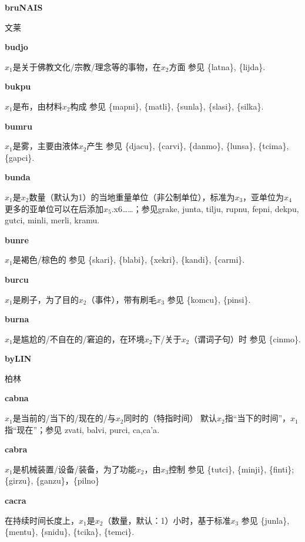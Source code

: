 \documentclass[notitlepage,twocolumn,a4paper,10pt]{book}
\begin{document}
{\sffamily\bfseries bruNAIS} 文莱

{\sffamily\bfseries budjo}\enspace {\ttfamily\bfseries[buj     bu'o]}  $x_1$是关于佛教文化\slash{}宗教\slash{}理念等的事物，在$x_2$方面 \textemdash{} 参见 \{latna\}, \{lijda\}.

{\sffamily\bfseries bukpu}\enspace {\ttfamily\bfseries[buk     bu'u]}  $x_1$是布，由材料$x_2$构成 \textemdash{} 参见 \{mapni\}, \{matli\}, \{sunla\}, \{slasi\}, \{silka\}.

{\sffamily\bfseries bumru}\enspace {\ttfamily\bfseries[bum]}  $x_1$是雾，主要由液体$x_2$产生 \textemdash{} 参见 \{djacu\}, \{carvi\}, \{danmo\}, \{lunsa\}, \{tcima\}, \{gapci\}.

{\sffamily\bfseries bunda}\enspace {\ttfamily\bfseries[bud]}  $x_1$是$x_2$数量（默认为1）的当地重量单位（非公制单位），标准为$x_3$，亚单位为$x_4$ \textemdash{} 更多的亚单位可以在后添加$x_5$.x6……；参见{grake}, {junta}, {tilju}, {rupnu}, {fepni}, {dekpu}, {gutci}, {minli}, {merli}, {kramu}.

{\sffamily\bfseries bunre}\enspace {\ttfamily\bfseries[bur     bu'e]}  $x_1$是褐色\slash{}棕色的 \textemdash{} 参见 \{skari\}, \{blabi\}, \{xekri\}, \{kandi\}, \{carmi\}.

{\sffamily\bfseries burcu}\enspace {\ttfamily\bfseries[    bru]}  $x_1$是刷子，为了目的$x_2$（事件），带有刷毛$x_3$ \textemdash{} 参见 \{komcu\}, \{pinsi\}.

{\sffamily\bfseries burna} $x_1$是尴尬的\slash{}不自在的\slash{}窘迫的，在环境$x_2$下\slash{}关于$x_2$（谓词子句）时 \textemdash{} 参见 \{cinmo\}.

{\sffamily\bfseries byLIN} 柏林

{\sffamily\bfseries cabna}\enspace {\ttfamily\bfseries[cab]}  $x_1$是当前的\slash{}当下的\slash{}现在的\slash{}与$x_2$同时的（特指时间） \textemdash{} 默认$x_2$指“当下的时间”，$x_1$指“现在”；参见 {zvati}, {balvi}, {purci}, {ca},{ca'a}.

{\sffamily\bfseries cabra}\enspace {\ttfamily\bfseries[        ca'a]}  $x_1$是机械装置\slash{}设备\slash{}装备，为了功能$x_2$，由$x_3$控制 \textemdash{} 参见 \{tutci\}, \{minji\}, \{finti\}; \{girzu\}, \{ganzu\}，\{pilno\}

{\sffamily\bfseries cacra} 在持续时间长度上，$x_1$是$x_2$（数量，默认：1）小时，基于标准$x_3$ \textemdash{} 参见 \{junla\}, \{mentu\}, \{snidu\}, \{tcika\}, \{temci\}.
\end{document}
